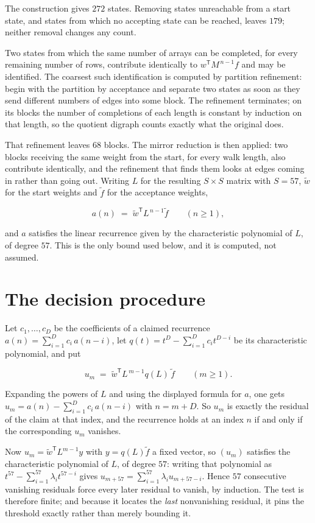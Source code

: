 \documentclass[11pt]{article}
\theoremstyle{definition}
\begin{document}
The construction gives $272$ states. Removing states unreachable from a start state, and states from which no accepting state can be reached, leaves $179$; neither removal changes any count.

Two states from which the same number of arrays can be completed, for every remaining number of rows, contribute identically to $w^{\mathsf T}M^{\,n-1}f$ and may be identified. The coarsest such identification is computed by partition refinement: begin with the partition by acceptance and separate two states as soon as they send different numbers of edges into some block. The refinement terminates; on its blocks the number of completions of each length is constant by induction on that length, so the quotient digraph counts exactly what the original does.

That refinement leaves $68$ blocks. The mirror reduction is then applied: two blocks receiving the same weight from the start, for every walk length, also contribute identically, and the refinement that finds them looks at edges coming in rather than going out. Writing $L$ for the resulting $S \times S$ matrix with $S = 57$, $\tilde w$ for the start weights and $\tilde f$ for the acceptance weights,

\[a(n) \;=\; \tilde w^{\mathsf T} L^{\,n-1} \tilde f \qquad (n \ge 1),\]

and $a$ satisfies the linear recurrence given by the characteristic polynomial of $L$, of degree $57$. This is the only bound used below, and it is computed, not assumed.

\section{The decision procedure}

Let $c_1,\dots,c_D$ be the coefficients of a claimed recurrence $a(n) = \sum_{i=1}^{D} c_i\,a(n-i)$, let $q(t) = t^{D} - \sum_{i=1}^{D} c_i t^{D-i}$ be its characteristic polynomial, and put

\[u_m \;=\; \tilde w^{\mathsf T} L^{\,m-1} q(L)\,\tilde f \qquad (m \ge 1).\]

Expanding the powers of $L$ and using the displayed formula for $a$, one gets $u_m = a(n) - \sum_{i=1}^{D} c_i\,a(n-i)$ with $n = m + D$. So $u_m$ is exactly the residual of the claim at that index, and the recurrence holds at an index $n$ if and only if the corresponding $u_m$ vanishes.

Now $u_m = \tilde w^{\mathsf T} L^{m-1} y$ with $y = q(L)\tilde f$ a fixed vector, so $(u_m)$ satisfies the characteristic polynomial of $L$, of degree $57$: writing that polynomial as $t^{57} - \sum_{i=1}^{57} \lambda_i t^{57-i}$ gives $u_{m+57} = \sum_{i=1}^{57} \lambda_i u_{m+57-i}$. Hence $57$ consecutive vanishing residuals force every later residual to vanish, by induction. The test is therefore finite; and because it locates the {\itshape last} nonvanishing residual, it pins the threshold exactly rather than merely bounding it.
\end{document}
